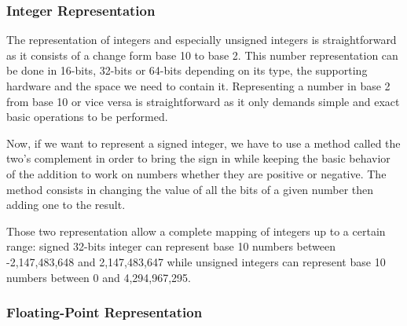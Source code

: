 \subsubsection{Integer Representation}

The representation of integers and especially unsigned integers is straightforward as it consists of a change form base 10 to base 2. This number representation can be done in 16-bits, 32-bits or 64-bits depending on its type, the supporting hardware and the space we need to contain it. Representing a number in base 2 from base 10 or vice versa is straightforward as it only demands simple and exact basic operations to be performed.


Now, if we want to represent a signed integer, we have to use a method called the two's complement in order to bring the sign in while keeping the basic behavior of the addition to work on numbers whether they are positive or negative. The method consists in changing the value of all the bits of a given number then adding one to the result.


Those two representation allow a complete mapping of integers up to a certain range: signed 32-bits integer can represent base 10 numbers between -2,147,483,648 and 2,147,483,647 while unsigned integers can represent base 10 numbers between 0 and 4,294,967,295.

\subsubsection{Floating-Point Representation}

